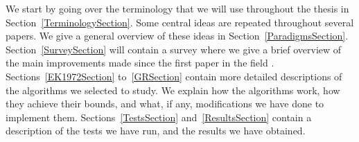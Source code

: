 We start by going over the terminology that we will use throughout the thesis in Section~\ref{TerminologySection}.
Some central ideas are repeated throughout several papers. We give a general overview of these ideas in Section~\ref{ParadigmsSection}.
Section~\ref{SurveySection} will contain a survey where we give a brief overview of the main improvements made since the first paper in the field \cite{FordFulkerson}.
Sections~\ref{EK1972Section} to~\ref{GRSection} contain more detailed descriptions of the algorithms we selected to study. 
We explain how the algorithms work, how they achieve their bounds, and what, if any, modifications we have done to implement them.
Sections~\ref{TestsSection} and~\ref{ResultsSection} contain a description of the tests we have run, and the results we have obtained.